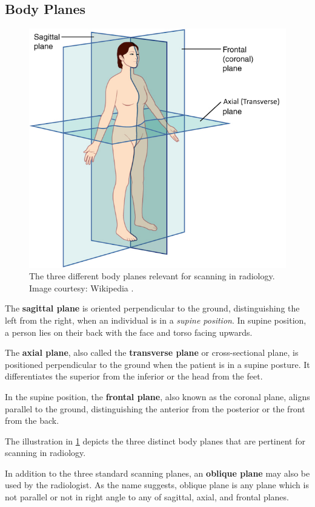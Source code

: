 \subsection{Body Planes}
%
\begin{figure}[!ht]
    \centering
    \includegraphics[width=0.5\linewidth]{figs/body_planes.png}
    \caption[Different body planes for radiological scanning]{The three different body planes relevant for scanning in radiology. Image courtesy: Wikipedia \cite{body_plane}.}
    \label{fig:body_plane}
\end{figure}
The \textbf{sagittal plane} is oriented perpendicular to the ground, distinguishing the left from the right, when an individual is in a \emph{supine position}. In supine position, a person lies on their back with the face and torso facing upwards.

The \textbf{axial plane}, also called the \textbf{transverse plane} or cross-sectional plane, is positioned perpendicular to the ground when the patient is in a supine posture. It differentiates the superior from the inferior or the head from the feet.

In the supine position, the \textbf{frontal plane}, also known as the coronal plane, aligns parallel to the ground, distinguishing the anterior from the posterior or the front from the back.

The illustration in \cref{fig:body_plane} depicts the three distinct body planes that are pertinent for scanning in radiology.

In addition to the three standard scanning planes, an \textbf{oblique plane} may also be used by the radiologist. As the name suggests, oblique plane is any plane which is not parallel or not in right angle to any of sagittal, axial, and frontal planes.


